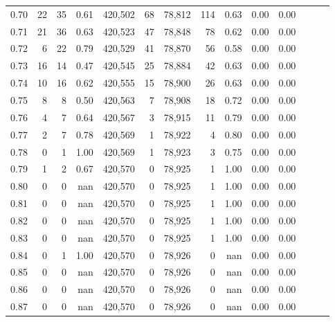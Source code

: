 \begin{tabular}{rrrrrrrrrrrrrr}
0.70 &      22 &     35 &  0.61 &  420,502 &       68 &  78,812 &     114 &  0.63 &  0.00 &      0.00 \\
0.71 &      21 &     36 &  0.63 &  420,523 &       47 &  78,848 &      78 &  0.62 &  0.00 &      0.00 \\
0.72 &       6 &     22 &  0.79 &  420,529 &       41 &  78,870 &      56 &  0.58 &  0.00 &      0.00 \\
0.73 &      16 &     14 &  0.47 &  420,545 &       25 &  78,884 &      42 &  0.63 &  0.00 &      0.00 \\
0.74 &      10 &     16 &  0.62 &  420,555 &       15 &  78,900 &      26 &  0.63 &  0.00 &      0.00 \\
0.75 &       8 &      8 &  0.50 &  420,563 &        7 &  78,908 &      18 &  0.72 &  0.00 &      0.00 \\
0.76 &       4 &      7 &  0.64 &  420,567 &        3 &  78,915 &      11 &  0.79 &  0.00 &      0.00 \\
0.77 &       2 &      7 &  0.78 &  420,569 &        1 &  78,922 &       4 &  0.80 &  0.00 &      0.00 \\
0.78 &       0 &      1 &  1.00 &  420,569 &        1 &  78,923 &       3 &  0.75 &  0.00 &      0.00 \\
0.79 &       1 &      2 &  0.67 &  420,570 &        0 &  78,925 &       1 &  1.00 &  0.00 &      0.00 \\
0.80 &       0 &      0 &   nan &  420,570 &        0 &  78,925 &       1 &  1.00 &  0.00 &      0.00 \\
0.81 &       0 &      0 &   nan &  420,570 &        0 &  78,925 &       1 &  1.00 &  0.00 &      0.00 \\
0.82 &       0 &      0 &   nan &  420,570 &        0 &  78,925 &       1 &  1.00 &  0.00 &      0.00 \\
0.83 &       0 &      0 &   nan &  420,570 &        0 &  78,925 &       1 &  1.00 &  0.00 &      0.00 \\
0.84 &       0 &      1 &  1.00 &  420,570 &        0 &  78,926 &       0 &   nan &  0.00 &      0.00 \\
0.85 &       0 &      0 &   nan &  420,570 &        0 &  78,926 &       0 &   nan &  0.00 &      0.00 \\
0.86 &       0 &      0 &   nan &  420,570 &        0 &  78,926 &       0 &   nan &  0.00 &      0.00 \\
0.87 &       0 &      0 &   nan &  420,570 &        0 &  78,926 &       0 &   nan &  0.00 &      0.00 \\

\end{tabular}
